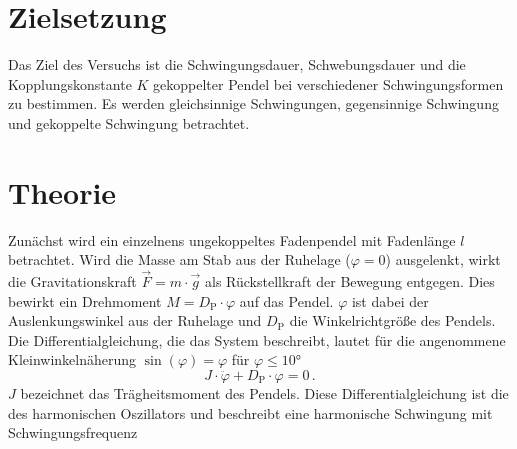 \section{Zielsetzung}
\label{sec:Zielsetzung}
Das Ziel des Versuchs ist die Schwingungsdauer, Schwebungsdauer und die Kopplungskonstante $K$ gekoppelter Pendel bei verschiedener Schwingungsformen zu bestimmen. 
Es werden gleichsinnige Schwingungen, gegensinnige Schwingung und gekoppelte Schwingung betrachtet.  

\section{Theorie}
\label{sec:Theorie}
Zunächst wird ein einzelnens ungekoppeltes Fadenpendel mit Fadenlänge $l$ betrachtet. 
Wird die Masse am Stab aus der Ruhelage ($\varphi = 0$) ausgelenkt, wirkt 
die Gravitationskraft $\vec{F} = m \cdot \vec{g}$ als Rückstellkraft der Bewegung entgegen. Dies bewirkt ein Drehmoment 
$M = D_{\text{P}} \cdot \varphi$ auf das Pendel. $\varphi$ ist dabei der Auslenkungswinkel aus der Ruhelage und $D_{\text{P}}$ die 
Winkelrichtgröße des Pendels. Die Differentialgleichung, die das System beschreibt, lautet für die angenommene Kleinwinkelnäherung 
$\sin(\varphi) = \varphi$ für $\varphi \leq 10°$
\begin{equation*}
    J \cdot \ddot{\varphi} + D_{\text{P}} \cdot \varphi = 0\,.
\end{equation*}
$J$ bezeichnet das Trägheitsmoment des Pendels. Diese Differentialgleichung ist die des harmonischen Oszillators und beschreibt eine harmonische Schwingung 
mit Schwingungsfrequenz 

